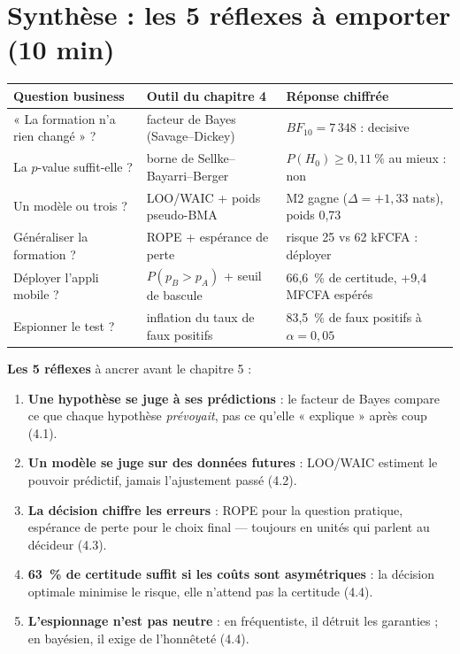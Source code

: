 \documentclass[11pt,a4paper]{article}
\begin{document}
\section{Synthèse : les 5 réflexes à emporter (10 min)}

\begin{contexte}
\begin{center}
\small
\begin{tabular}{@{}p{3.9cm} p{4.1cm} p{5.4cm}@{}}
\toprule
\textbf{Question business} & \textbf{Outil du chapitre 4} & \textbf{Réponse chiffrée} \\
\midrule
« La formation n'a rien changé » ? & facteur de Bayes (Savage--Dickey) & $BF_{10} = 7\,348$ : decisive \\
La $p$-value suffit-elle ? & borne de Sellke--Bayarri--Berger & $P(H_0) \ge 0{,}11~\%$ au mieux : non \\
Un modèle ou trois ? & LOO/WAIC + poids pseudo-BMA & M2 gagne ($\Delta = +1{,}33$ nats), poids 0,73 \\
Généraliser la formation ? & ROPE + espérance de perte & risque 25 vs 62 kFCFA : déployer \\
Déployer l'appli mobile ? & $P(p_B > p_A)$ + seuil de bascule & 66,6~\% de certitude, +9,4 MFCFA espérés \\
Espionner le test ? & inflation du taux de faux positifs & 83,5~\% de faux positifs à $\alpha = 0{,}05$ \\
\bottomrule
\end{tabular}
\end{center}

\textbf{Les 5 réflexes} à ancrer avant le chapitre 5 :
\begin{enumerate}[leftmargin=5mm, itemsep=1mm]
  \item \textbf{Une hypothèse se juge à ses prédictions} : le facteur de
        Bayes compare ce que chaque hypothèse \emph{prévoyait}, pas ce qu'elle
        « explique » après coup (4.1).
  \item \textbf{Un modèle se juge sur des données futures} : LOO/WAIC
        estiment le pouvoir prédictif, jamais l'ajustement passé (4.2).
  \item \textbf{La décision chiffre les erreurs} : ROPE pour la question
        pratique, espérance de perte pour le choix final --- toujours en
        unités qui parlent au décideur (4.3).
  \item \textbf{63~\% de certitude suffit si les coûts sont asymétriques} :
        la décision optimale minimise le risque, elle n'attend pas la
        certitude (4.4).
  \item \textbf{L'espionnage n'est pas neutre} : en fréquentiste, il détruit
        les garanties ; en bayésien, il exige de l'honnêteté (4.4).
\end{enumerate}
\end{contexte}
\end{document}
